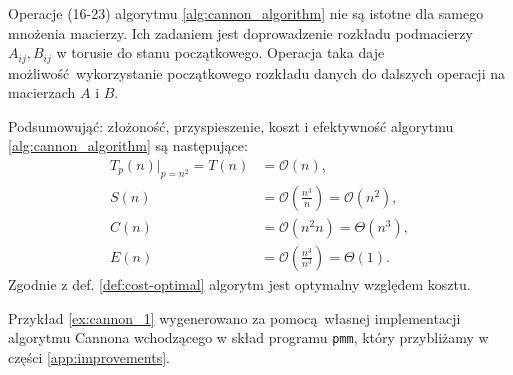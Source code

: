 Operacje (16-23) algorytmu \ref{alg:cannon_algorithm} nie są istotne dla samego mnożenia macierzy. Ich zadaniem jest doprowadzenie rozkładu podmacierzy \(A_{ij}, B_{ij}\) w torusie do stanu początkowego. Operacja taka daje możliwość wykorzystanie początkowego rozkładu danych do dalszych operacji na macierzach \(A\) i \(B\).


Podsumowująć: złożoność, przyspieszenie, koszt i efektywność algorytmu \ref{alg:cannon_algorithm} są następujące\cite{Czech}:
\begin{align*}
T_p(n)|_{p=n^2} = T(n) &= \mathcal{O}(n), \\
S(n) &= \mathcal{O}(\frac{n^3}{n}) = \mathcal{O}(n^2), \\
C(n) &= \mathcal{O}(n^2n)=\Theta(n^3), \\
E(n) &= \mathcal{O}(\frac{n^3}{n^3})=\Theta(1).
\end{align*}
Zgodnie z def. \ref{def:cost-optimal} algorytm jest optymalny względem kosztu.


\clearpage

Przykład \ref{ex:cannon_1} wygenerowano za pomocą własnej implementacji algorytmu Cannona wchodzącego w skład programu \texttt{pmm}, który przybliżamy w części \ref{app:improvements}. 

